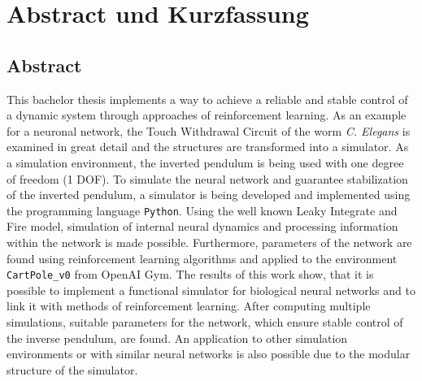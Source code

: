 %
\chapter*{Abstract und Kurzfassung}
%

%
\section*{Abstract}
%
This bachelor thesis implements a way to achieve a reliable and stable control of a dynamic system through approaches of reinforcement learning. As an example for a neuronal network, the \glqq Touch Withdrawal Circuit\grqq{} of the worm \textit{C. Elegans} is examined in great detail and the structures are transformed into a simulator. As a simulation environment, the inverted pendulum is being used with one degree of freedom (1 DOF). To simulate the neural network and guarantee stabilization of the inverted pendulum, a simulator is being developed and implemented using the programming language \texttt{Python}. Using the well known Leaky Integrate and Fire model, simulation of internal neural dynamics and processing information within the network is made possible. Furthermore, parameters of the network are found using reinforcement learning algorithms and applied to the environment \texttt{CartPole\_v0} from OpenAI Gym. The results of this work show, that it is possible to implement a functional simulator for biological neural networks and to link it with methods of reinforcement learning. After computing multiple simulations, suitable parameters for the network, which ensure stable control of the inverse pendulum, are found. An application to other simulation environments or with similar neural networks is also possible due to the modular structure of the simulator.


%
